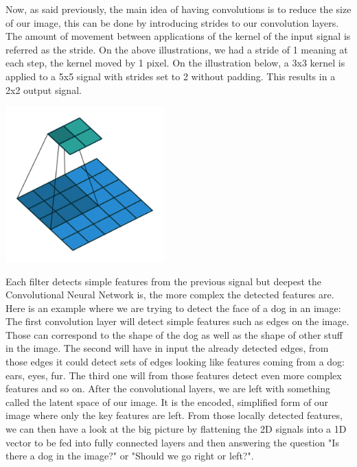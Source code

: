 \documentclass[12pt]{article}
\begin{document}
Now, as said previously, the main idea of having convolutions is to reduce the size of our image, this can be done by introducing strides to our convolution layers. The amount of movement between applications of the kernel of the input signal is referred as the stride. On the above illustrations, we had a stride of 1 meaning at each step, the kernel moved by 1 pixel. On the illustration below, a 3x3 kernel is applied to a 5x5 signal with strides set to 2 without padding. This results in a 2x2 output signal. \\
\centerline{\includegraphics[height=6cm]{../../docs/strides.png}}

Each filter detects simple features from the previous signal but deepest the Convolutional Neural Network is, the more complex the detected features are. Here is an example where we are trying to detect the face of a dog in an image: 
The first convolution layer will detect simple features such as edges on the image. Those can correspond to the shape of the dog as well as the shape of other stuff in the image. The second will have in input the already detected edges, from those edges it could detect sets of edges looking like features coming from a dog: ears, eyes, fur. The third one will from those features detect even more complex features and so on.
After the convolutional layers, we are left with something called the latent space of our image. It is the encoded, simplified form of our image where only the key features are left. From those locally detected features, we can then have a look at the big picture by flattening the 2D signals into a 1D vector to be fed into fully connected layers and then answering the question "Is there a dog in the image?" or "Should we go right or left?". \\
\end{document}
